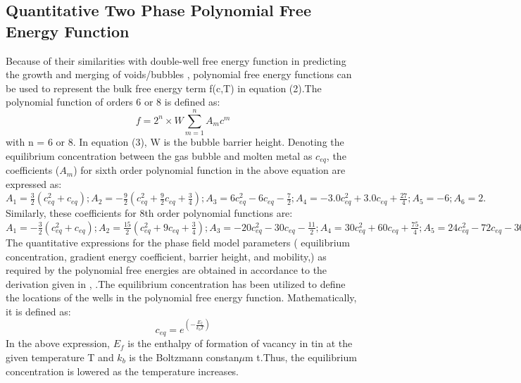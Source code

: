 \documentclass[10pt,a4paper]{article}
\begin{document}
\subsection{Quantitative Two Phase Polynomial Free Energy Function}
Because of their similarities with double-well free energy function in predicting the growth and merging of voids/bubbles \cite{8}, polynomial free energy functions can be used to represent the bulk free energy term f(c,T) in equation (2).The polynomial function of orders 6 or 8 is defined as:
\begin{equation}
f = 2^{n} \times W \sum_{m=1} ^{n} A_m c^m 
\end{equation}
with n = 6 or 8.
In equation (3), W is the bubble barrier height. Denoting the equilibrium concentration between the gas bubble and molten metal as $c_{eq}$, the coefficients ($A_m$) for sixth order polynomial function in the above equation are expressed as:
$
A_1 =  \frac{3}{2} \left(c_{eq} ^2 + c_{eq} \right); 
A_2 = - \frac{9}{2} \left(c_{eq} ^2 + \frac{9}{2} c_{eq} + \frac{3}{4}\right);
A_3 = 6 c_{eq} ^2 - 6 c_{eq} - \frac{7}{2}; 
A_4 = -3.0 c_{eq} ^2 + 3.0 c_{eq} + \frac{27}{4};
A_5 = -6;
A_6 =  2. 
$ Similarly, these coefficients for 8th order polynomial functions are:
$
A_1 = - \frac{3}{2} \left(c_{eq} ^2 + c_{eq} \right); 
A_2 =  \frac{15}{2} \left(c_{eq} ^2 + 9 c_{eq} + \frac{3}{4}\right);
A_3 = -20 c_{eq} ^2 - 30 c_{eq} - \frac{11}{2}; 
A_4 = 30 c_{eq} ^2 + 60 c_{eq} + \frac{75}{4};
A_5 = 24 c_{eq} ^2 - 72 c_{eq} -36;
A_6 =  8c_{eq} ^2 + 48 c_{eq} +40; 
A_7 = \frac{96}{7} c_{eq} - 24; 
A_8 = 6.
$
The quantitative expressions for the phase field model parameters ( equilibrium concentration, gradient energy coefficient, barrier height, and  mobility,) as required by the polynomial free energies are obtained in accordance to the derivation given in \cite{12}, \cite{13}.The equilibrium concentration has been utilized to define the locations of the wells in the polynomial free energy function. Mathematically, it is defined as:
\begin{equation}
c_{eq} = e^{(- \frac{E_f}{k_{b}T})}
\end{equation}
In the above expression, $E_f$ is the enthalpy of formation of vacancy in tin at the given temperature T and $k_b$ is the Boltzmann constan$\mu$m t.Thus, the equilibrium concentration is lowered as the temperature increases.
\end{document}
